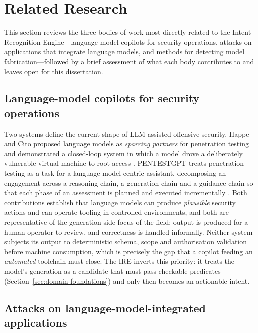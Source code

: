 \section{Related Research}\label{sec:related-research}

This section reviews the three bodies of work most directly related to the
Intent Recognition Engine---language-model copilots for security operations,
attacks on applications that integrate language models, and methods for
detecting model fabrication---followed by a brief assessment of what each body
contributes to and leaves open for this dissertation.

\subsection*{Language-model copilots for security operations}

Two systems define the current shape of LLM-assisted offensive security. Happe
and Cito proposed language models as \emph{sparring partners} for penetration
testing and demonstrated a closed-loop system in which a model drove a
deliberately vulnerable virtual machine to root access \parencite{happe2023pwned}.
PENTESTGPT treats penetration testing as a task for a language-model-centric
assistant, decomposing an engagement across a reasoning chain, a generation
chain and a guidance chain so that each phase of an assessment is planned and
executed incrementally \parencite{deng2024pentestgpt}. Both contributions
establish that language models can produce \emph{plausible} security actions
and can operate tooling in controlled environments, and both are representative
of the generation-side focus of the field: output is produced for a human
operator to review, and correctness is handled informally. Neither system
subjects its output to deterministic schema, scope and authorisation validation
before machine consumption, which is precisely the gap that a copilot feeding
an \emph{automated} toolchain must close. The IRE inverts this priority: it
treats the model's generation as a candidate that must pass checkable
predicates (Section~\ref{sec:domain-foundations}) and only then becomes an
actionable intent.

\subsection*{Attacks on language-model-integrated applications}

